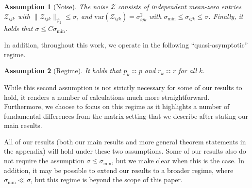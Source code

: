 \documentclass[10pt]{article}
\newcommand{\0}{{\mathbf{0}}}
\newcommand{\1}{{\mathbf{1}}}
\newtheorem{assumption}{Assumption}
\begin{document}
\begin{assumption}[Noise] \label{ass:noise}
The noise $\mathcal{Z}$ consists of independent mean-zero entries $\mathcal{Z}_{ijk}$ with $\|\mathcal{Z}_{ijk} \|_{\psi_2} \leq \sigma$, and $\mathrm{var}(\mathcal{Z}_{ijk}) = \sigma^2_{ijk}$ with $\sigma_{\min} \leq \sigma_{ijk} \leq \sigma$.  Finally, it holds that $\sigma \leq C \sigma_{\min} $.  \end{assumption}



In addition, throughout this work, we operate in the following ``quasi-asymptotic'' regime. 


\begin{assumption}[Regime]
It holds that $p_{k} \asymp p$ and $r_k \asymp r$ for all $k$.%
\end{assumption}

While this second assumption is not strictly necessary for some of our results to hold, it renders a number of calculations much more straightforward.  Furthermore, we choose to focus on this regime as it highlights a number of fundamental differences from the matrix setting that we describe after stating our main results.  



All of our results (both our main results and more general theorem statements in the appendix) will hold under these two assumptions.  Some of our results also do not require the assumption $\sigma \lesssim \sigma_{\min}$, but we make clear when this is the case.  In addition, it may be possible to extend our results to a broader regime, where $\sigma_{\min} \ll \sigma$, but this regime is beyond the scope of this paper.  
\end{document}
